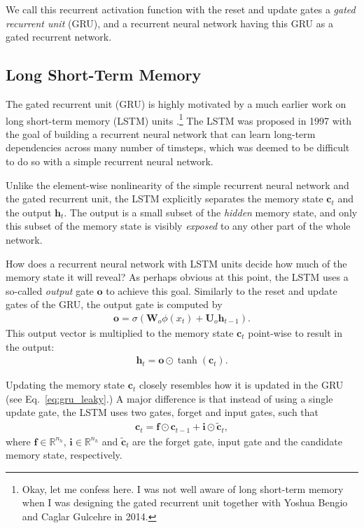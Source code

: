 \documentclass{report}
\newcommand{\vect}[1]{\mathbf{#1}}
\newcommand{\matr}[1]{\mathbf{#1}}
\newcommand{\vc}[0]{\vect{c}}
\newcommand{\vh}[0]{\vect{h}}
\newcommand{\vf}[0]{\vect{f}}
\newcommand{\vi}[0]{\vect{i}}
\newcommand{\vo}[0]{\vect{o}}
\newcommand{\mW}[0]{\matr{W}}
\newcommand{\mU}[0]{\matr{U}}
\newcommand{\RR}[0]{\mathbb{R}}
\newcommand{\sigmoid}{\sigma}
\begin{document}
We call this recurrent activation function with the reset and update gates a
{\em gated recurrent unit} (GRU), and a recurrent neural network having this GRU
as a gated recurrent network.

\subsection{Long Short-Term Memory}
\label{sec:lstm}

The gated recurrent unit (GRU) is highly motivated by a much earlier work on
long short-term memory (LSTM) units \cite{hochreiter1997long}.\footnote{
    Okay, let me confess here. I was not well aware of long short-term memory
    when I was designing the gated recurrent unit together with Yoshua Bengio
    and Caglar Gulcehre in 2014.
} The LSTM was proposed in 1997 with the goal of building a recurrent neural
network that can learn long-term dependencies across many number of timsteps,
which was deemed to be difficult to do so with a simple recurrent neural
network. 

Unlike the element-wise nonlinearity of the simple recurrent neural network and
the gated recurrent unit, the LSTM explicitly separates the memory state $\vc_t$
and the output $\vh_t$. The output is a small subset of the {\em hidden} memory
state, and only this subset of the memory state is visibly {\em exposed} to any
other part of the whole network. 

How does a recurrent neural network with LSTM units decide how much of the
memory state it will reveal?  As perhaps obvious at this point, the LSTM uses a
so-called {\em output} gate $\vo$ to achieve this goal. Similarly to the reset
and update gates of the GRU, the output gate is computed by
\begin{align*}
    \vo = \sigmoid(\mW_o \phi(x_t) + \mU_o \vh_{t-1}).
\end{align*}
This output vector is multiplied to the memory state $\vc_t$ point-wise to
result in the output:
\begin{align*}
    \vh_t = \vo \odot \tanh(\vc_t).
\end{align*}

Updating the memory state $\vc_t$ closely resembles how it is updated in the GRU
(see Eq.~\eqref{eq:gru_leaky}.) A major difference is that instead of using a
single update gate, the LSTM uses two gates, forget and input gates, such that
\begin{align*}
    \vc_t = \vf \odot \vc_{t-1} + \vi \odot \tilde{\vc}_t,
\end{align*}
where $\vf \in \RR^{n_h}$, $\vi \in \RR^{n_h}$ and $\tilde{\vc}_t$ are the
forget gate, input gate and the candidate memory state, respectively.
\end{document}
